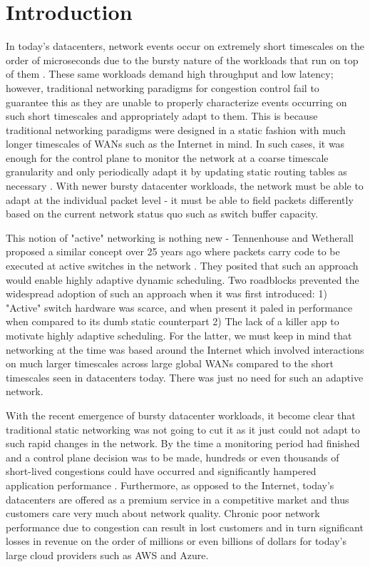 \section{Introduction}

In today's datacenters, network events occur on extremely short timescales on the order of microseconds due to the bursty nature of the workloads that run on top of them \cite{microburst}. These same workloads demand high throughput and low latency; however, traditional networking paradigms for congestion control fail to guarantee this as they are unable to properly characterize events occurring on such short timescales and appropriately adapt to them. This is because traditional networking paradigms were designed in a static fashion with much longer timescales of WANs such as the Internet in mind. In such cases, it was enough for the control plane to monitor the network at a coarse timescale granularity and only periodically adapt it by updating static routing tables as necessary \cite{sdn}. With newer bursty datacenter workloads, the network must be able to adapt at the individual packet level - it must be able to field packets differently based on the current network status quo such as switch buffer capacity.

This notion of "active" networking is nothing new - Tennenhouse and Wetherall proposed a similar concept over 25 years ago where packets carry code to be executed at active switches in the network \cite{active}. They posited that such an approach would enable highly adaptive dynamic scheduling. Two roadblocks prevented the widespread adoption of such an approach when it was first introduced: 1) "Active" switch hardware was scarce, and when present it paled in performance when compared to its dumb static counterpart 2) The lack of a killer app to motivate highly adaptive scheduling. For the latter, we must keep in mind that networking at the time was based around the Internet which involved interactions on much larger timescales across large global WANs compared to the short timescales seen in datacenters today. There was just no need for such an adaptive network.

With the recent emergence of bursty datacenter workloads, it become clear that traditional static networking was not going to cut it as it just could not adapt to such rapid changes in the network. By the time a monitoring period had finished and a control plane decision was to be made, hundreds or even thousands of short-lived congestions could have occurred and significantly hampered application performance \cite{microburst}. Furthermore, as opposed to the Internet, today's datacenters are offered as a premium service in a competitive market and thus customers care very much about network quality. Chronic poor network performance due to congestion can result in lost customers and in turn significant losses in revenue on the order of millions or even billions of dollars for today's large cloud providers such as AWS and Azure.

